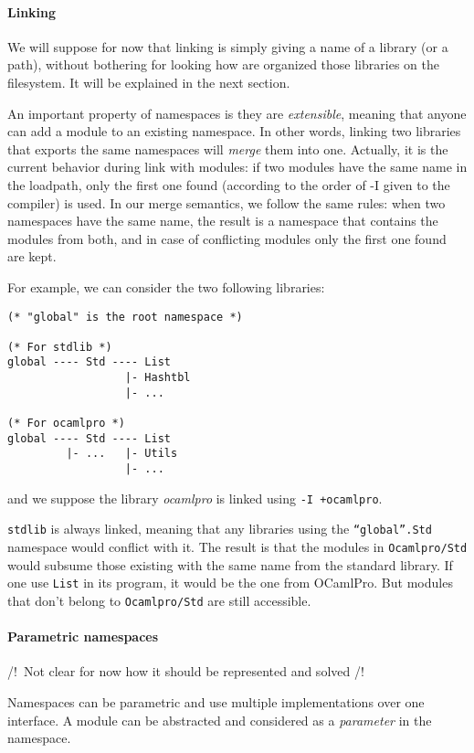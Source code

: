 \documentclass[11pt,a4paper]{article}
\begin{document}
\paragraph{Linking} We will suppose for now that linking is simply giving a name
of a library (or a path), without bothering for looking how are organized those
libraries on the filesystem. It will be explained in the next section.

An important property of namespaces is they are \emph{extensible}, meaning that
anyone can add a module to an existing namespace. In other words, linking two
libraries that exports the same namespaces will \emph{merge} them into
one. Actually, it is the current behavior during link with modules: if two
modules have the same name in the loadpath, only the first one found (according
to the order of -I given to the compiler) is used. In our merge semantics, we
follow the same rules: when two namespaces have the same name, the result is a
namespace that contains the modules from both, and in case of conflicting
modules only the first one found are kept.

For example, we can consider the two following libraries:

\begin{verbatim}
(* "global" is the root namespace *)

(* For stdlib *)
global ---- Std ---- List
                  |- Hashtbl
                  |- ...

(* For ocamlpro *)
global ---- Std ---- List
         |- ...   |- Utils
                  |- ...
\end{verbatim}
and we suppose the library \emph{ocamlpro} is linked using \texttt{-I +ocamlpro}.

\texttt{stdlib} is always linked, meaning that any libraries using the
\texttt{``global''.Std} namespace would conflict with it. The result is that the
modules in \texttt{Ocamlpro/Std} would subsume those existing with the same name
from the standard library. If one use \texttt{List} in its program, it would
be the one from OCamlPro. But modules that don't belong to \texttt{Ocamlpro/Std}
are still accessible.


\paragraph{Parametric namespaces}

/!\ Not clear for now how it should be represented and solved /!\


Namespaces can be parametric and use multiple implementations over one
interface. A module can be abstracted and considered as a \emph{parameter} in
the namespace. 
\end{document}

